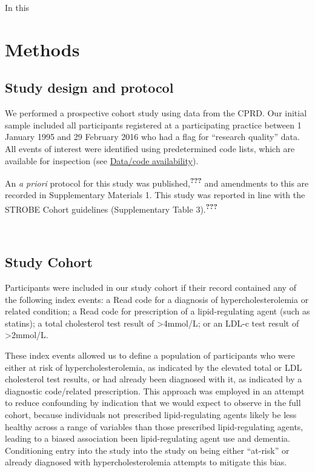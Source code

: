 \documentclass[a4paper, twoside]{templates/ociamthesis}
\begin{document}
In this

\hypertarget{methods-1}{%
\section{Methods}\label{methods-1}}

\hypertarget{study-design-and-protocol}{%
\subsection{Study design and protocol}\label{study-design-and-protocol}}

We performed a prospective cohort study using data from the CPRD. Our initial sample included all participants registered at a participating practice between 1 January 1995 and 29 February 2016 who had a flag for ``research quality'' data. All events of interest were identified using predetermined code lists, which are available for inspection (see \protect\hyperlink{data-code-avail}{Data/code availability}).

An \emph{a priori} protocol for this study was published,\textsuperscript{{\textbf{???}}} and amendments to this are recorded in Supplementary Materials 1. This study was reported in line with the STROBE Cohort guidelines (Supplementary Table 3).\textsuperscript{{\textbf{???}}}

~

\hypertarget{study-cohort}{%
\subsection{Study Cohort}\label{study-cohort}}

Participants were included in our study cohort if their record contained any of the following index events: a Read code for a diagnosis of hypercholesterolemia or related condition; a Read code for prescription of a lipid-regulating agent (such as statins); a total cholesterol test result of \textgreater4mmol/L; or an LDL-c test result of \textgreater2mmol/L.

These index events allowed us to define a population of participants who were either at risk of hypercholesterolemia, as indicated by the elevated total or LDL cholesterol test results, or had already been diagnosed with it, as indicated by a diagnostic code/related prescription. This approach was employed in an attempt to reduce confounding by indication that we would expect to observe in the full cohort, because individuals not prescribed lipid-regulating agents likely be less healthy across a range of variables than those prescribed lipid-regulating agents, leading to a biased association been lipid-regulating agent use and dementia. Conditioning entry into the study into the study on being either ``at-risk'' or already diagnosed with hypercholesterolemia attempts to mitigate this bias.
\end{document}

